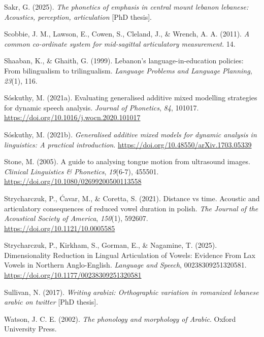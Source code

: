 \documentclass[
  man,
  longtable,
  nolmodern,
  notxfonts,
  notimes,
  colorlinks=true,linkcolor=blue,citecolor=blue,urlcolor=blue]{apa7}
\newlength{\cslhangindent}
\newenvironment{CSLReferences}[2] %
 {\begin{list}{}{%
  \setlength{\itemindent}{0pt}
  \setlength{\leftmargin}{0pt}
  \setlength{\parsep}{0pt}
  \ifodd #1
   \setlength{\leftmargin}{\cslhangindent}
   \setlength{\itemindent}{-1\cslhangindent}
  \fi
  \setlength{\itemsep}{#2\baselineskip}}}
 {\end{list}}
\begin{document}
\begin{CSLReferences}{1}{0}
Sakr, G. (2025). \emph{The phonetics of emphasis in central mount
lebanon lebanese: Acoustics, perception, articulation} {[}PhD thesis{]}.

Scobbie, J. M., Lawson, E., Cowen, S., Cleland, J., \& Wrench, A. A.
(2011). \emph{A common co-ordinate system for mid-sagittal articulatory
measurement}. 14.

Shaaban, K., \& Ghaith, G. (1999). Lebanon's language-in-education
policies: From bilingualism to trilingualism. \emph{Language Problems
and Language Planning}, \emph{23}(1), 116.

Sóskuthy, M. (2021a). Evaluating generalised additive mixed modelling
strategies for dynamic speech analysis. \emph{Journal of Phonetics},
\emph{84}, 101017. \url{https://doi.org/10.1016/j.wocn.2020.101017}

Sóskuthy, M. (2021b). \emph{Generalised additive mixed models for
dynamic analysis in linguistics: A practical introduction}.
\url{https://doi.org/10.48550/arXiv.1703.05339}

Stone, M. (2005). A guide to analysing tongue motion from ultrasound
images. \emph{Clinical Linguistics \& Phonetics}, \emph{19}(6-7),
455501. \url{https://doi.org/10.1080/02699200500113558}

Strycharczuk, P., Ćavar, M., \& Coretta, S. (2021). Distance vs time.
Acoustic and articulatory consequences of reduced vowel duration in
polish. \emph{The Journal of the Acoustical Society of America},
\emph{150}(1), 592607. \url{https://doi.org/10.1121/10.0005585}

Strycharczuk, P., Kirkham, S., Gorman, E., \& Nagamine, T. (2025).
Dimensionality Reduction in Lingual Articulation of Vowels: Evidence
From Lax Vowels in Northern Anglo-English. \emph{Language and Speech},
00238309251320581. \url{https://doi.org/10.1177/00238309251320581}

Sullivan, N. (2017). \emph{Writing arabizi: Orthographic variation in
romanized lebanese arabic on twitter} {[}PhD thesis{]}.

Watson, J. C. E. (2002). \emph{The phonology and morphology of Arabic}.
Oxford University Press.


\end{CSLReferences}
\end{document}
